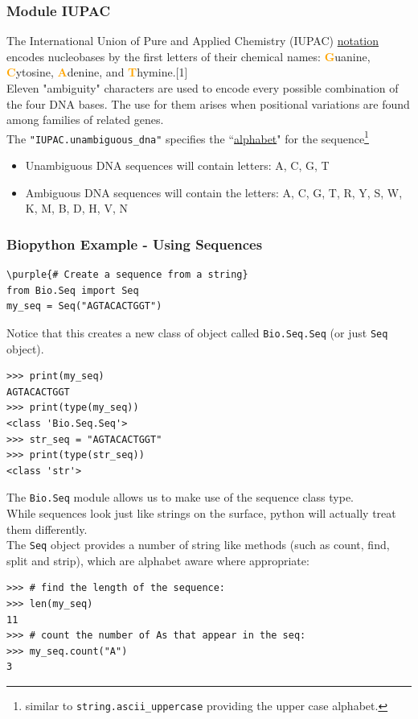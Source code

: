 \documentclass[xcolor=svgnames, handout]{beamer}
\newcommand{\purple}[1]{{\textcolor{purple}{#1}}}
\newcommand{\nl}{\\[1em]}
\newcommand{\define}[1]{\textbf{\textcolor{orange}{#1}}}
\newcommand{\ft}[1]{\frametitle{#1}}
\begin{document}
\begin{frame}[fragile]\ft{Module IUPAC}
The International Union of Pure and Applied Chemistry (IUPAC)
\href{https://www.bioinformatics.org/sms/iupac.html}{notation} encodes nucleobases  by the first letters of their chemical names: \define Guanine,  \define Cytosine, \define Adenine, and \define Thymine.[1]\nl

Eleven "ambiguity" characters are used to encode every possible combination of the four DNA bases.  The use for them arises when  positional variations are found among families of related genes.\nl

The \verb|"IUPAC.unambiguous_dna"| specifies the ``\href{http://biopython.org/DIST/docs/api/Bio.Alphabet.IUPAC-module.html}{alphabet}" for the sequence\footnote{similar to {\tt string.ascii\_uppercase} providing the upper case alphabet.}
\begin{itemize}
\item Unambiguous DNA sequences will contain letters: A, C, G, T
\item Ambiguous DNA sequences will contain the letters: A, C, G, T,  R, Y, S, W, K, M, B, D, H, V, N
\end{itemize}
\end{frame}


\begin{frame}[fragile]\ft{Biopython Example - Using Sequences}
\begin{Verbatim}[commandchars=\\\{\}]
\purple{# Create a sequence from a string}
from Bio.Seq import Seq
my_seq = Seq("AGTACACTGGT")
\end{Verbatim}
Notice that this creates a new class of object called {\tt Bio.Seq.Seq} (or just {\tt Seq} object).
\begin{Verbatim}[frame=single]
>>> print(my_seq)
AGTACACTGGT
>>> print(type(my_seq))
<class 'Bio.Seq.Seq'>
>>> str_seq = "AGTACACTGGT"
>>> print(type(str_seq))
<class 'str'>
\end{Verbatim}


\end{frame}





\begin{frame}[fragile]
 The {\tt Bio.Seq} module allows us to make use of the sequence class type. \nl
 While sequences look just like strings on the surface, python will actually treat them differently.\nl
The {\tt Seq} object provides a number of string like methods (such as count, find, split and strip), which are alphabet aware where appropriate:
\begin{Verbatim}[frame=single]
>>> # find the length of the sequence:
>>> len(my_seq)
11
>>> # count the number of As that appear in the seq:
>>> my_seq.count("A")
3
\end{Verbatim}

\end{frame}
\end{document}
